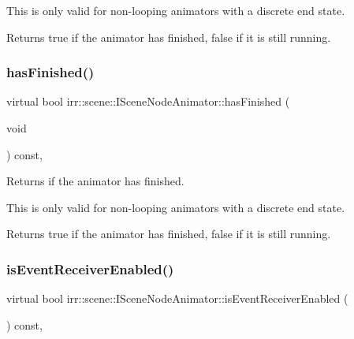 This is only valid for non-\/looping animators with a discrete end state. \begin{DoxyReturn}{Returns}
true if the animator has finished, false if it is still running. 
\end{DoxyReturn}
\mbox{\label{classirr_1_1scene_1_1ISceneNodeAnimator_a77fd626155079b11327f0bd775e85425}} 
\subsubsection{\texorpdfstring{has\+Finished()}{hasFinished()}\hspace{0.1cm}{\footnotesize\ttfamily [2/2]}}
{\footnotesize\ttfamily virtual bool irr\+::scene\+::\+I\+Scene\+Node\+Animator\+::has\+Finished (\begin{DoxyParamCaption}\item[{void}]{ }\end{DoxyParamCaption}) const\hspace{0.3cm}{\ttfamily [inline]}, {\ttfamily [virtual]}}



Returns if the animator has finished. 

This is only valid for non-\/looping animators with a discrete end state. \begin{DoxyReturn}{Returns}
true if the animator has finished, false if it is still running. 
\end{DoxyReturn}
\mbox{\label{classirr_1_1scene_1_1ISceneNodeAnimator_a37b22b8767dc6adca575223f02458740}} 
\subsubsection{\texorpdfstring{is\+Event\+Receiver\+Enabled()}{isEventReceiverEnabled()}\hspace{0.1cm}{\footnotesize\ttfamily [1/2]}}
{\footnotesize\ttfamily virtual bool irr\+::scene\+::\+I\+Scene\+Node\+Animator\+::is\+Event\+Receiver\+Enabled (\begin{DoxyParamCaption}{ }\end{DoxyParamCaption}) const\hspace{0.3cm}{\ttfamily [inline]}, {\ttfamily [virtual]}}



